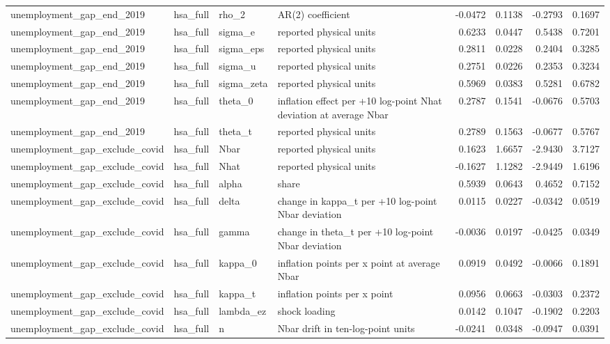 \begin{tabular}{llllrrrr}
unemployment\_gap\_end\_2019 & hsa\_full & rho\_2 & AR(2) coefficient & -0.0472 & 0.1138 & -0.2793 & 0.1697 \\
unemployment\_gap\_end\_2019 & hsa\_full & sigma\_e & reported physical units & 0.6233 & 0.0447 & 0.5438 & 0.7201 \\
unemployment\_gap\_end\_2019 & hsa\_full & sigma\_eps & reported physical units & 0.2811 & 0.0228 & 0.2404 & 0.3285 \\
unemployment\_gap\_end\_2019 & hsa\_full & sigma\_u & reported physical units & 0.2751 & 0.0226 & 0.2353 & 0.3234 \\
unemployment\_gap\_end\_2019 & hsa\_full & sigma\_zeta & reported physical units & 0.5969 & 0.0383 & 0.5281 & 0.6782 \\
unemployment\_gap\_end\_2019 & hsa\_full & theta\_0 & inflation effect per +10 log-point Nhat deviation at average Nbar & 0.2787 & 0.1541 & -0.0676 & 0.5703 \\
unemployment\_gap\_end\_2019 & hsa\_full & theta\_t & reported physical units & 0.2789 & 0.1563 & -0.0677 & 0.5767 \\
unemployment\_gap\_exclude\_covid & hsa\_full & Nbar & reported physical units & 0.1623 & 1.6657 & -2.9430 & 3.7127 \\
unemployment\_gap\_exclude\_covid & hsa\_full & Nhat & reported physical units & -0.1627 & 1.1282 & -2.9449 & 1.6196 \\
unemployment\_gap\_exclude\_covid & hsa\_full & alpha & share & 0.5939 & 0.0643 & 0.4652 & 0.7152 \\
unemployment\_gap\_exclude\_covid & hsa\_full & delta & change in kappa\_t per +10 log-point Nbar deviation & 0.0115 & 0.0227 & -0.0342 & 0.0519 \\
unemployment\_gap\_exclude\_covid & hsa\_full & gamma & change in theta\_t per +10 log-point Nbar deviation & -0.0036 & 0.0197 & -0.0425 & 0.0349 \\
unemployment\_gap\_exclude\_covid & hsa\_full & kappa\_0 & inflation points per x point at average Nbar & 0.0919 & 0.0492 & -0.0066 & 0.1891 \\
unemployment\_gap\_exclude\_covid & hsa\_full & kappa\_t & inflation points per x point & 0.0956 & 0.0663 & -0.0303 & 0.2372 \\
unemployment\_gap\_exclude\_covid & hsa\_full & lambda\_ez & shock loading & 0.0142 & 0.1047 & -0.1902 & 0.2203 \\
unemployment\_gap\_exclude\_covid & hsa\_full & n & Nbar drift in ten-log-point units & -0.0241 & 0.0348 & -0.0947 & 0.0391 \\

\end{tabular}
